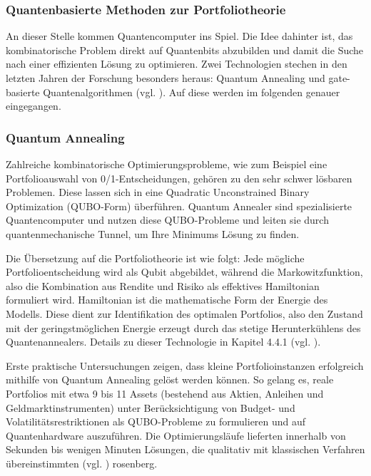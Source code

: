 \subsubsection*{Quantenbasierte Methoden zur Portfoliotheorie}

An dieser Stelle kommen Quantencomputer ins Spiel. Die Idee dahinter ist, das kombinatorische Problem direkt auf Quantenbits abzubilden und damit die Suche nach einer effizienten Lösung zu optimieren. Zwei Technologien stechen in den letzten Jahren der Forschung besonders heraus: Quantum Annealing und gate-basierte Quantenalgorithmen (vgl. \cite{mugel_dynamic_2022, orus_quantum_2019}). Auf diese werden im folgenden genauer eingegangen.

\subsubsection*{Quantum Annealing}
 
Zahlreiche kombinatorische Optimierungsprobleme, wie zum Beispiel eine Portfolioauswahl von 0/1-Entscheidungen, gehören zu den sehr schwer lösbaren Problemen. Diese lassen sich in eine Quadratic Unconstrained Binary Optimization (QUBO-Form) überführen. Quantum Annealer sind spezialisierte Quantencomputer und nutzen diese QUBO-Probleme und leiten sie durch quantenmechanische Tunnel, um Ihre Minimums Lösung zu finden. 

Die Übersetzung auf die Portfoliotheorie ist wie folgt: Jede mögliche Portfolioentscheidung wird als Qubit abgebildet, während die Markowitzfunktion, also die Kombination aus Rendite und Risiko als effektives Hamiltonian formuliert wird. Hamiltonian ist die mathematische Form der Energie des Modells. Diese dient zur Identifikation des optimalen Portfolios, also den Zustand mit der geringstmöglichen Energie erzeugt durch das stetige Herunterkühlens des Quantenannealers. Details zu dieser Technologie in Kapitel 4.4.1 (vgl. \cite{mugel_dynamic_2022}).
 
Erste praktische Untersuchungen zeigen, dass kleine Portfolioinstanzen erfolgreich mithilfe von Quantum Annealing gelöst werden können. So gelang es, reale Portfolios mit etwa 9 bis 11 Assets (bestehend aus Aktien, Anleihen und Geldmarktinstrumenten) unter Berücksichtigung von Budget- und Volatilitätsrestriktionen als QUBO-Probleme zu formulieren und auf Quantenhardware auszuführen. Die Optimierungsläufe lieferten innerhalb von Sekunden bis wenigen Minuten Lösungen, die qualitativ mit klassischen Verfahren übereinstimmten (vgl. \cite{sakuler_real-world_2025}) rosenberg.
 
